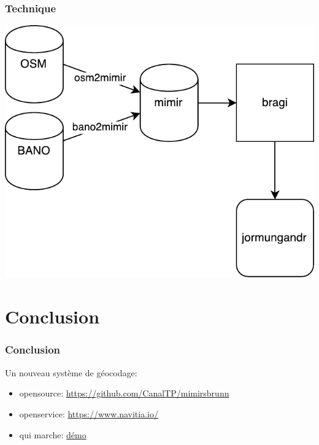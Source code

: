\documentclass[table]{beamer}
\begin{document}
\begin{frame}
  \frametitle{Technique}

  \centering
  \includegraphics[height=0.7\textheight]{images/mimirsbrunn}
\end{frame}

\section{Conclusion}

\begin{frame}
  \frametitle{Conclusion}

  Un nouveau système de géocodage:
  \begin{itemize}
  \item opensource: \url{https://github.com/CanalTP/mimirsbrunn}
  \item openservice: \url{https://www.navitia.io/}
  \item qui marche: \href{http://canaltp.github.io/navitia-playground/play.html?request=https\%3A\%2F\%2Fapi.navitia.io\%2Fv1\%2Fplaces\%3Fq\%3D20\%2520hec\%2520mal\%26from\%3D2.364391\%253B48.866436\%26&token=4e5c-bf9d-4fc9-8a60-d47fb98b1b0e}{démo}
  \end{itemize}
\end{frame}

\begin{frame}
  \titlepage
\end{frame}
\end{document}

